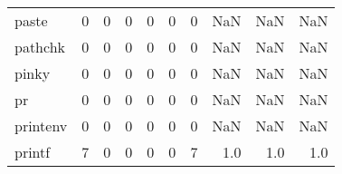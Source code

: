\begin{longtable}{lrrrrrrrrr}
paste     &                                       0 &                                                  0 &                                                  0 &                                                  0 &                                                  0 &                                                  0 &                                                NaN &                                    NaN &                                  NaN \\
pathchk   &                                       0 &                                                  0 &                                                  0 &                                                  0 &                                                  0 &                                                  0 &                                                NaN &                                    NaN &                                  NaN \\
pinky     &                                       0 &                                                  0 &                                                  0 &                                                  0 &                                                  0 &                                                  0 &                                                NaN &                                    NaN &                                  NaN \\
pr        &                                       0 &                                                  0 &                                                  0 &                                                  0 &                                                  0 &                                                  0 &                                                NaN &                                    NaN &                                  NaN \\
printenv  &                                       0 &                                                  0 &                                                  0 &                                                  0 &                                                  0 &                                                  0 &                                                NaN &                                    NaN &                                  NaN \\
printf    &                                       7 &                                                  0 &                                                  0 &                                                  0 &                                                  0 &                                                  7 &                                                1.0 &                                    1.0 &                                  1.0 \\

\end{longtable}
